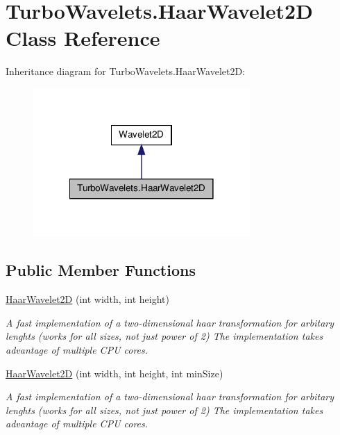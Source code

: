 \hypertarget{class_turbo_wavelets_1_1_haar_wavelet2_d}{\section{\-Turbo\-Wavelets.\-Haar\-Wavelet2\-D \-Class \-Reference}
\label{class_turbo_wavelets_1_1_haar_wavelet2_d}
}


\-Inheritance diagram for \-Turbo\-Wavelets.\-Haar\-Wavelet2\-D\-:
\nopagebreak
\begin{figure}[H]
\begin{center}
\leavevmode
\includegraphics[width=234pt]{class_turbo_wavelets_1_1_haar_wavelet2_d__inherit__graph}
\end{center}
\end{figure}
\subsection*{\-Public \-Member \-Functions}
\begin{DoxyCompactItemize}
\item 
\hyperlink{class_turbo_wavelets_1_1_haar_wavelet2_d_ab55a20658fe1f22b6e756418b4e1dc29}{\-Haar\-Wavelet2\-D} (int width, int height)
\begin{DoxyCompactList}\small\item\em \-A fast implementation of a two-\/dimensional haar transformation for arbitary lenghts (works for all sizes, not just power of 2) \-The implementation takes advantage of multiple \-C\-P\-U cores. \end{DoxyCompactList}\item 
\hyperlink{class_turbo_wavelets_1_1_haar_wavelet2_d_a8064166eec2c0a4b66378896b882bd47}{\-Haar\-Wavelet2\-D} (int width, int height, int min\-Size)
\begin{DoxyCompactList}\small\item\em \-A fast implementation of a two-\/dimensional haar transformation for arbitary lenghts (works for all sizes, not just power of 2) \-The implementation takes advantage of multiple \-C\-P\-U cores. \end{DoxyCompactList}\end{DoxyCompactItemize}


